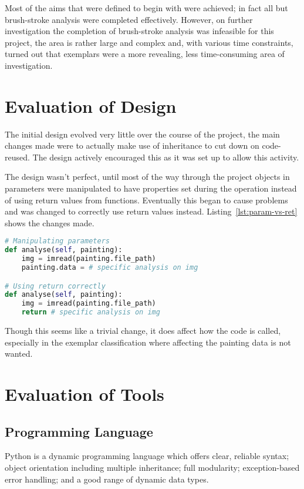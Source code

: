 Most of the aims that were defined to begin with were achieved; in fact all but brush-stroke 
analysis were completed effectively. However, on further investigation the completion of 
brush-stroke analysis was infeasible for this project, the area is rather large and complex and, 
with various time constraints, turned out that exemplars were a more revealing, less 
time-consuming area of investigation.


\section{Evaluation of Design}
The initial design evolved very little over the course of the project, the main changes made were
to actually make use of inheritance to cut down on code-reused. The design actively encouraged
this as it was set up to allow this activity.

The design wasn't perfect, until most of the way through the project objects in parameters were 
manipulated to have properties set during the operation instead of using return values from 
functions. Eventually this began to cause problems and was changed to correctly use return values
instead. Listing~\ref{lst:param-vs-ret} shows the changes made.

\begin{lstlisting}[caption={Using return values instead of manipulating parameters},
label=lst:param-vs-ret,
breaklines=true,
language=python,
frame=single]
# Manipulating parameters
def analyse(self, painting):
    img = imread(painting.file_path)
    painting.data = # specific analysis on img

# Using return correctly
def analyse(self, painting):
    img = imread(painting.file_path)
    return # specific analysis on img
\end{lstlisting}

Though this seems like a trivial change, it does affect how the code is called, especially in the
exemplar classification where affecting the painting data is not wanted.


\section{Evaluation of Tools}

\subsection{Programming Language}
Python is a dynamic programming language which offers clear, reliable syntax; object orientation
including multiple inheritance; full modularity; exception-based error handling; and a good range
of dynamic data types.

